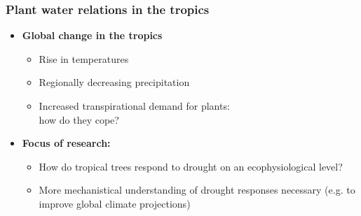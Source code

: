 \documentclass[usepdftitle=false]{beamer}
\newcommand{\rar}{$\rightarrow$}
\newcommand{\Rar}{$\Rightarrow$}
\begin{document}
\begin{frame}
	\frametitle{Plant water relations in the tropics}
   \begin{itemize}
   	\item \textbf{Global change in the tropics}
   	\begin{itemize}
   		\item \alert<1>{Rise in temperatures}
   		\item \alert<1>{Regionally decreasing precipitation}
   		\item<2-| alert@2>[\rar] Increased transpirational demand for plants:\\ how do they cope?
   	\end{itemize}
   	\item<visible@3-> \textbf{ Focus of research:}
   	\begin{itemize}
   		\item<alert@3> How do tropical trees respond to drought on an ecophysiological level?
   		\item<visible@4| alert@4>[\Rar] More mechanistical understanding of drought responses necessary (e.g. to improve global climate projections)
   	\end{itemize}
   \end{itemize}
\end{frame}
\end{document}

